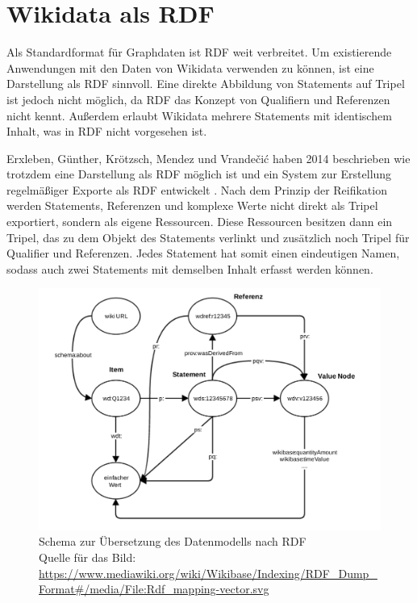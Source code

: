 \section{Wikidata als RDF}
Als Standardformat für Graphdaten ist RDF weit verbreitet.
Um existierende Anwendungen mit den Daten von Wikidata verwenden zu können, ist eine Darstellung als RDF sinnvoll.
Eine direkte Abbildung von Statements auf Tripel ist jedoch nicht möglich, da RDF das Konzept von Qualifiern und Referenzen nicht kennt.
Außerdem erlaubt Wikidata mehrere Statements mit identischem Inhalt, was in RDF nicht vorgesehen ist.

Erxleben, Günther, Krötzsch, Mendez und Vrandečić haben 2014 beschrieben wie trotzdem eine Darstellung als RDF möglich ist und ein System zur Erstellung regelmäßiger Exporte als RDF entwickelt \cite{wikidata-rdf-export}.
Nach dem Prinzip der Reifikation werden Statements, Referenzen und komplexe Werte nicht direkt als Tripel exportiert, sondern als eigene Ressourcen. 
Diese Ressourcen besitzen dann ein Tripel, das zu dem Objekt des Statements verlinkt und zusätzlich noch Tripel für Qualifier und Referenzen.
Jedes Statement hat somit einen eindeutigen Namen, sodass auch zwei Statements mit demselben Inhalt erfasst werden können.
\begin{figure}
  \includegraphics[width=\linewidth]{pics/Rdf_mapping}
  \caption{Schema zur Übersetzung des Datenmodells nach RDF \\ Quelle für das Bild: \url{https://www.mediawiki.org/wiki/Wikibase/Indexing/RDF_Dump_Format\#/media/File:Rdf_mapping-vector.svg}}
  \label{fig:rdf-mapping}
\end{figure}

